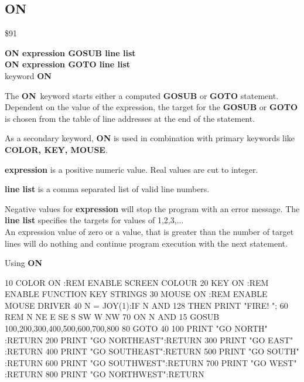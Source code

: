 \subsection{ON}
\begin{description}[leftmargin=3cm,style=nextline]
\item [Token:] \$91
\item [Format:] {\bf ON expression GOSUB line list} \\
                {\bf ON expression GOTO line list}  \\
                 keyword {\bf ON}
\item [Usage:]  The {\bf ON} keyword starts
                either a computed {\bf GOSUB} or {\bf GOTO} statement.
                Dependent on the value of the expression, the target
                for the {\bf GOSUB} or {\bf GOTO} is chosen from
                the table of line addresses at the end of the statement.

                As a secondary keyword, {\bf ON} is used in
                combination with primary keywords like
                {\bf COLOR, KEY, MOUSE}.

                {\bf expression} is a positive numeric value.
                Real values are cut to integer.

                {\bf line list} is a comma separated list of valid
                line numbers.

\item [Remarks:] Negative values for {\bf expression} will stop
                 the program with an error message.
                 The {\bf line list} specifies the targets for values
                 of 1,2,3,... \\
                 An expression value of zero or a value, that is greater
                 than the number of target lines will do nothing and
                 continue program execution with the next statement.

\item [Example:] Using {\bf ON}
\begin{screenoutput}
 10 COLOR ON :REM ENABLE SCREEN COLOUR
 20 KEY   ON :REM ENABLE FUNCTION KEY STRINGS
 30 MOUSE ON :REM ENABLE MOUSE DRIVER
 40 N = JOY(1):IF N AND 128 THEN PRINT "FIRE! ";
 60 REM                N   NE  E   SE  S   SW  W   NW
 70 ON N AND 15 GOSUB 100,200,300,400,500,600,700,800
 80 GOTO 40
100 PRINT "GO NORTH"    :RETURN
200 PRINT "GO NORTHEAST":RETURN
300 PRINT "GO EAST"     :RETURN
400 PRINT "GO SOUTHEAST":RETURN
500 PRINT "GO SOUTH"    :RETURN
600 PRINT "GO SOUTHWEST":RETURN
700 PRINT "GO WEST"     :RETURN
800 PRINT "GO NORTHWEST":RETURN
\end{screenoutput}
\end{description}

